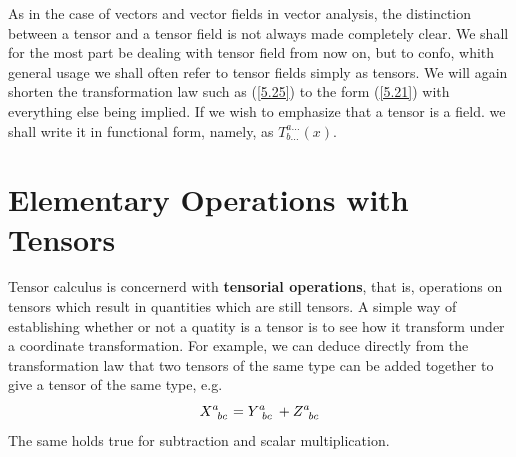 As in the case of vectors and vector fields in vector analysis, the distinction between a tensor and a tensor field is not always made completely clear. We shall for the most part be dealing with tensor field from now on, but to confo, whith general usage we shall often refer to tensor fields simply as tensors. We will again shorten the transformation law such as (\ref{5.25}) to the form (\ref{5.21}) with everything else being implied. If we wish to emphasize that a tensor is a field. we shall write it in functional form, namely, as $T_{b...}^{a...}(x)$.

\section{Elementary Operations with Tensors}\label{sec:5.8}
Tensor calculus is concernerd with \textbf{tensorial operations}, that is, operations on tensors which result in quantities which are still tensors. A simple way of establishing whether or not a quatity is a tensor is to see how it transform under a coordinate transformation. For example, we can deduce directly from the transformation law that two tensors of the same type can be added together to give a tensor of the same type, e.g.
\begin{equation}\label{5.26}
  \tensor{X}{^{a}_{bc}} = \tensor{Y}{^{a}_{bc}} + \tensor{Z}{^{a}_{bc}}
\end{equation}
The same holds true for subtraction and scalar multiplication.

